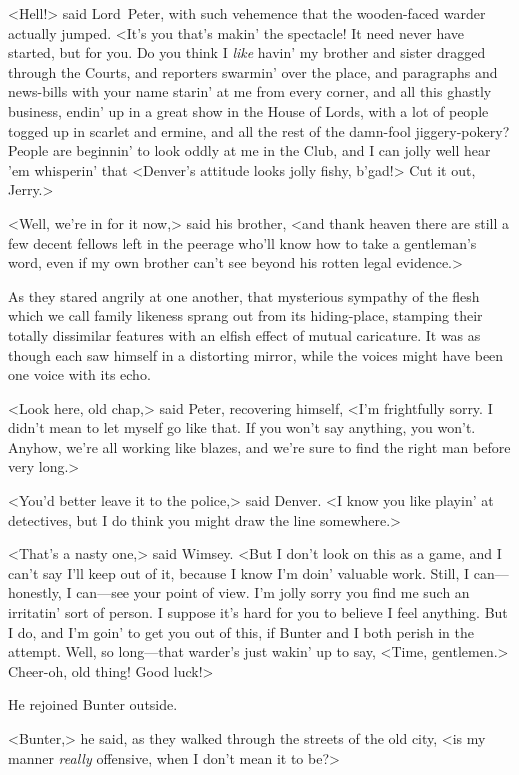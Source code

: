<Hell!> said Lord~Peter, with such vehemence that the wooden-faced warder actually jumped. <It's you that's makin' the spectacle! It need never have started, but for you. Do you think I \emph{like} havin' my brother and sister dragged through the Courts, and reporters swarmin' over the place, and paragraphs and news-bills with your name starin' at me from every corner, and all this ghastly business, endin' up in a great show in the House of Lords, with a lot of people togged up in scarlet and ermine, and all the rest of the damn-fool jiggery-pokery? People are beginnin' to look oddly at me in the Club, and I can jolly well hear 'em whisperin' that <Denver's attitude looks jolly fishy, b'gad!> Cut it out, Jerry.>

<Well, we're in for it now,> said his brother, <and thank heaven there are still a few decent fellows left in the peerage who'll know how to take a gentleman's word, even if my own brother can't see beyond his rotten legal evidence.>

As they stared angrily at one another, that mysterious sympathy of the flesh which we call family likeness sprang out from its hiding-place, stamping their totally dissimilar features with an elfish effect of mutual caricature. It was as though each saw himself in a distorting mirror, while the voices might have been one voice with its echo.

<Look here, old chap,> said Peter, recovering himself, <I'm frightfully sorry. I didn't mean to let myself go like that. If you won't say anything, you won't. Anyhow, we're all working like blazes, and we're sure to find the right man before very long.>

<You'd better leave it to the police,> said Denver. <I know you like playin' at detectives, but I do think you might draw the line somewhere.>

<That's a nasty one,> said Wimsey. <But I don't look on this as a game, and I can't say I'll keep out of it, because I know I'm doin' valuable work. Still, I can—honestly, I can—see your point of view. I'm jolly sorry you find me such an irritatin' sort of person. I suppose it's hard for you to believe I feel anything. But I do, and I'm goin' to get you out of this, if Bunter and I both perish in the attempt. Well, so long—that warder's just wakin' up to say, <Time, gentlemen.> Cheer-oh, old thing! Good luck!>

He rejoined Bunter outside.

<Bunter,> he said, as they walked through the streets of the old city, <is my manner \emph{really} offensive, when I don't mean it to be?>

